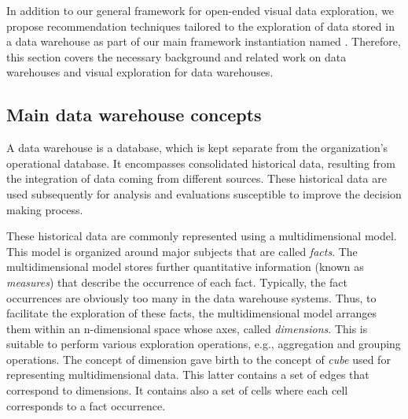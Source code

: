 In addition to our general framework for open-ended visual data exploration, we propose recommendation techniques tailored to the exploration of data stored in a data warehouse as part of our main framework instantiation named \prototype{}. Therefore, this section covers the necessary background and related work on data warehouses and visual exploration for data warehouses. 


\subsection{Main data warehouse concepts}


A data warehouse is a database, which is kept separate from the organization's operational database.
It encompasses consolidated historical data, resulting from the integration of data coming from different sources. 
These historical data are used subsequently for analysis and evaluations susceptible to improve the decision making process.

These historical data are commonly represented using a multidimensional model.
This model is organized around major subjects that are called \emph{facts}.
The multidimensional model stores further quantitative information (known as \emph{measures}) that describe the occurrence of each fact.  
Typically, the fact occurrences are obviously too many in the data warehouse systems. Thus, to facilitate the exploration of these facts, the multidimensional model arranges them within an n-dimensional space whose axes, called \emph{dimensions}. This is suitable to perform various exploration operations, e.g., aggregation and grouping operations. The concept of dimension gave birth to the concept of \emph{cube} used for representing multidimensional data. This latter contains a set of edges that correspond to dimensions. It contains also a set of cells where each cell corresponds to a fact occurrence.




